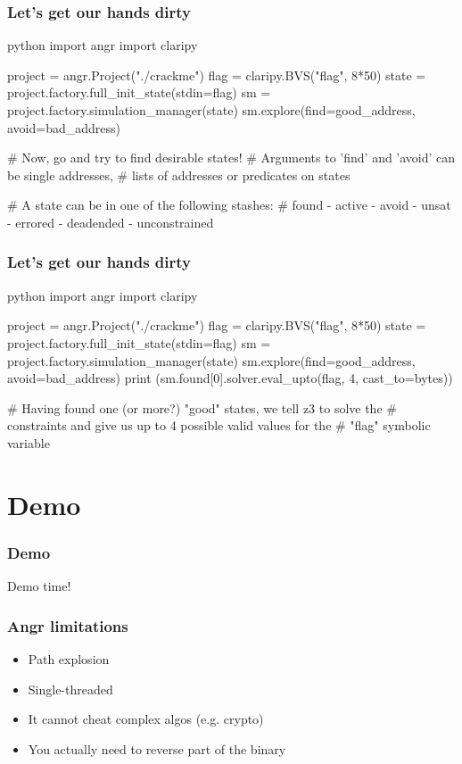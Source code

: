 \documentclass[aspectratio=169]{beamer}
\begin{document}
\begin{frame}[fragile]
	\frametitle{Let's get our hands dirty}
	\begin{codebox}{python}
import angr
import claripy

project = angr.Project("./crackme")
flag = claripy.BVS("flag", 8*50)
state = project.factory.full_init_state(stdin=flag)
sm = project.factory.simulation_manager(state)
sm.explore(find=good_address, avoid=bad_address)

# Now, go and try to find desirable states!
# Arguments to 'find' and 'avoid' can be single addresses,
# lists of addresses or predicates on states

# A state can be in one of the following stashes:
# found - active - avoid - unsat - errored - deadended - unconstrained\end{codebox}
\end{frame}


\begin{frame}[fragile]
	\frametitle{Let's get our hands dirty}
	\begin{codebox}{python}
import angr
import claripy

project = angr.Project("./crackme")
flag = claripy.BVS("flag", 8*50)
state = project.factory.full_init_state(stdin=flag)
sm = project.factory.simulation_manager(state)
sm.explore(find=good_address, avoid=bad_address)
print (sm.found[0].solver.eval_upto(flag, 4, cast_to=bytes))

# Having found one (or more?) "good" states, we tell z3 to solve the
# constraints and give us up to 4 possible valid values for the 
# "flag" symbolic variable\end{codebox}
\end{frame}



\section{Demo}
\begin{frame}[fragile]
	\frametitle{Demo}
	\begin{center}
		Demo time!
	\end{center}
\end{frame}


\begin{frame}[fragile]
	\frametitle{Angr limitations}
	\begin{itemize}
		\item Path explosion
		\item Single-threaded
		\item It cannot cheat complex algos (e.g. crypto)
		\item You actually need to reverse part of the binary
	\end{itemize}
\end{frame}
\end{document}
